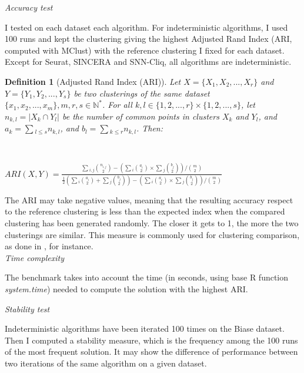 \documentclass{report}
\newtheorem{definition}{Definition}[section]
\begin{document}
{\bigskip
\noindent \textit{Accuracy test}
\bigskip

I tested on each dataset each algorithm. For indeterministic algorithms, I used 100 runs and kept the clustering giving the highest Adjusted Rand Index\cite{rand1971objective} (ARI, computed with MClust\cite{fraley1999mclust}) with the reference clustering I fixed for each dataset. Except for Seurat, SINCERA and SNN-Cliq, all algorithms are indeterministic. 

\begin{definition}[Adjusted Rand Index (ARI)]\label{ARI}{
Let $X = \{X_1, X_2, ..., X_r\}$ and $Y = \{Y_1, Y_2, ..., Y_s\}$ be two clusterings of the same dataset $\{x_1, x_2, ..., x_m\}, m, r, s \in \mathbb{N^{*}}$. For all $k,l \in \{1,2,...,r\} \times \{1,2,...,s\}$, let $n_{k,l} = |X_k \cap Y_l|$ be the number of common points in clusters $X_k$ and $Y_l$, and $a_k = \sum{_{l \leq s}}{n_{k,l}}$, and $b_l = \sum{_{k \leq r}}{n_{k,l}}$. Then:}\end{definition}\\

\begin{center}
$ARI(X, Y) = \frac{\sum{_{i,j}}{{n_{i,j}}\choose{2}} - (\sum{_i}{{a_i}\choose{2}} \times \sum{_j}{{b_j}\choose{2}})/{{m}\choose{2}}}{\frac{1}{2} (\sum{_i}{{a_i}\choose{2}} + \sum{_j}{{b_j}\choose{2}}) - (\sum{_i}{{a_i}\choose{2}} \times \sum{_j}{{b_j}\choose{2}})/{{m}\choose{2}}}$
\end{center}

The ARI may take negative values, meaning that the resulting accuracy respect to the reference clustering is less than the expected index when the compared clustering has been generated randomly. The closer it gets to 1, the more the two clusterings are similar. This measure is commonly used for clustering comparison, as done in \cite{kiselev2016sc3}\cite{jaskowiak2014selection}, for instance.\\

\bigskip
\noindent \textit{Time complexity}
\bigskip

The benchmark takes into account the time (in seconds, using base R function \emph{system.time}) needed to compute the solution with the highest ARI.

\bigskip
\noindent \textit{Stability test}
\bigskip

Indeterministic algorithms have been iterated 100 times on the Biase dataset. Then I computed a stability measure, which is the frequency among the 100 runs of the most frequent solution. It may show the difference of performance between two iterations of the same algorithm on a given dataset.

}
\end{document}
